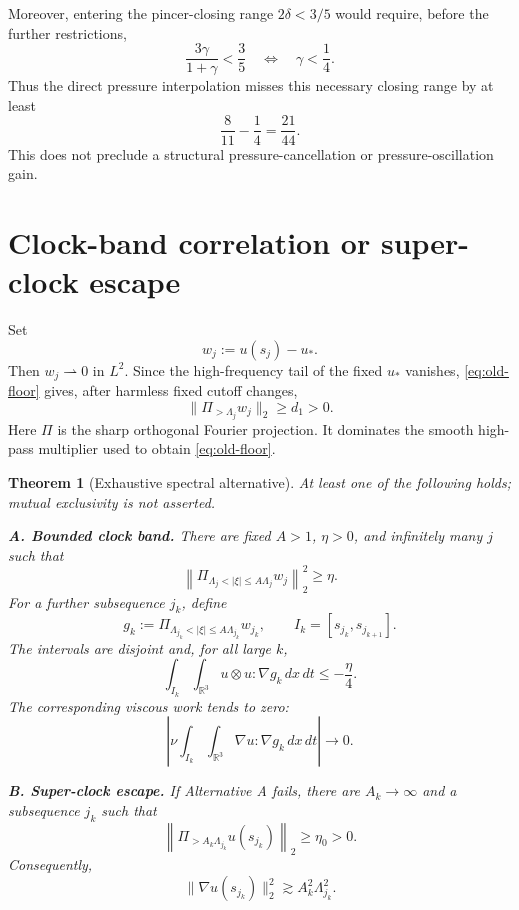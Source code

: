 \documentclass[11pt]{article}
\newtheorem{theorem}{Theorem}
\theoremstyle{remark}
\newcommand{\R}{\mathbb R}
\newcommand{\weakto}{\rightharpoonup}
\begin{document}
Moreover, entering the pincer-closing range \(2\delta<3/5\) would
require, before the further restrictions,
\[
 \frac{3\gamma}{1+\gamma}<\frac35
 \quad\Longleftrightarrow\quad
 \gamma<\frac14.
\]
Thus the direct pressure interpolation misses this necessary closing
range by at least
\begin{equation}
 \label{eq:pressure-gap}
 \boxed{
 \frac8{11}-\frac14=\frac{21}{44}.
 }
\end{equation}
This does not preclude a structural pressure-cancellation or
pressure-oscillation gain.

\section{Clock-band correlation or super-clock escape}

Set
\[
 w_j:=u(s_j)-u_*.
\]
Then \(w_j\weakto0\) in \(L^2\).  Since the high-frequency tail of the
fixed \(u_*\) vanishes, \eqref{eq:old-floor} gives, after harmless
fixed cutoff changes,
\begin{equation}
 \label{eq:w-tail}
 \|\Pi_{>\Lambda_j}w_j\|_2\geq d_1>0.
\end{equation}
Here \(\Pi\) is the sharp orthogonal Fourier projection.  It dominates
the smooth high-pass multiplier used to obtain
\eqref{eq:old-floor}.

\begin{theorem}[Exhaustive spectral alternative]
\label{thm:spectral}
At least one of the following holds; mutual exclusivity is not asserted.

\medskip
\noindent
\textbf{A. Bounded clock band.}
There are fixed \(A>1\), \(\eta>0\), and infinitely many \(j\) such
that
\begin{equation}
 \label{eq:clock-band}
 \left\|
 \Pi_{\Lambda_j<|\xi|\leq A\Lambda_j}w_j
 \right\|_2^2
 \geq\eta.
\end{equation}
For a further subsequence \(j_k\), define
\[
 g_k
 :=
 \Pi_{\Lambda_{j_k}<|\xi|\leq A\Lambda_{j_k}}w_{j_k},
 \qquad
 I_k=[s_{j_k},s_{j_{k+1}}].
\]
The intervals are disjoint and, for all large \(k\),
\begin{equation}
 \label{eq:signed-work}
 \boxed{
 \int_{I_k}\!\!\int_{\R^3}
 u\otimes u:\nabla g_k\,dx\,dt
 \leq-\frac{\eta}{4}.
 }
\end{equation}
The corresponding viscous work tends to zero:
\begin{equation}
 \label{eq:viscous-zero}
 \left|
 \nu\int_{I_k}\!\!\int_{\R^3}
 \nabla u:\nabla g_k\,dx\,dt
 \right|\longrightarrow0.
\end{equation}

\medskip
\noindent
\textbf{B. Super-clock escape.}
If Alternative A fails, there are \(A_k\to\infty\) and a subsequence
\(j_k\) such that
\begin{equation}
 \label{eq:superclock-tail}
 \left\|
 \Pi_{>A_k\Lambda_{j_k}}u(s_{j_k})
 \right\|_2
 \geq\eta_0>0.
\end{equation}
Consequently,
\begin{equation}
 \label{eq:superclock-enstrophy}
 \boxed{
 \|\nabla u(s_{j_k})\|_2^2
 \gtrsim
 A_k^2\Lambda_{j_k}^2.
 }
\end{equation}
\end{theorem}
\end{document}

